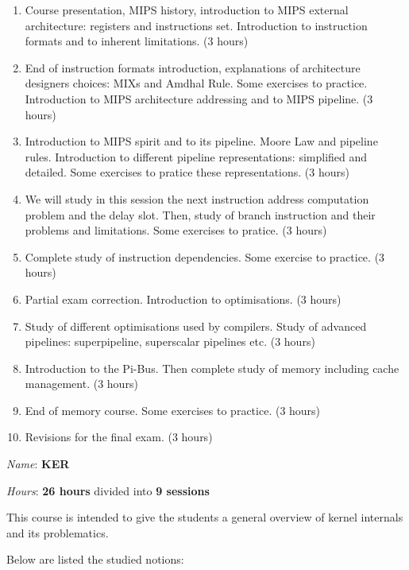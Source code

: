 \begin{multicols}{2}
\begin{enumerate}
  \item
    Course presentation, MIPS history, introduction to MIPS external
    architecture: registers and instructions set. Introduction to
    instruction formats and to inherent limitations. (3 hours)
  \item
    End of instruction formats introduction, explanations of architecture
    designers choices: MIXs and Amdhal Rule. Some exercises to practice.
    Introduction to MIPS architecture addressing and to MIPS pipeline.
    (3 hours)
  \item
    Introduction to MIPS spirit and to its pipeline. Moore Law and
    pipeline rules. Introduction to different pipeline representations:
    simplified and detailed. Some exercises to pratice these representations.
    (3 hours)
  \item
    We will study in this session the next instruction address computation
    problem and the delay slot. Then, study of branch instruction and their
    problems and limitations. Some exercises to pratice. (3 hours)
  \item
    Complete study of instruction dependencies. Some exercise to practice.
    (3 hours)
  \item
    Partial exam correction. Introduction to optimisations. (3 hours)
  \item
    Study of different optimisations used by compilers. Study of
    advanced pipelines: superpipeline, superscalar pipelines etc. (3 hours)
  \item
    Introduction to the Pi-Bus. Then complete study of memory including
    cache management. (3 hours)
  \item
    End of memory course. Some exercises to practice. (3 hours)
  \item
    Revisions for the final exam. (3 hours)
\end{enumerate}


\textit{Name}: \textbf{KER}

\textit{Hours}: \textbf{26 hours} divided into \textbf{9 sessions}

This course is intended to give the students a general overview of
kernel internals and its problematics.

Below are listed the studied notions:


\end{multicols}

